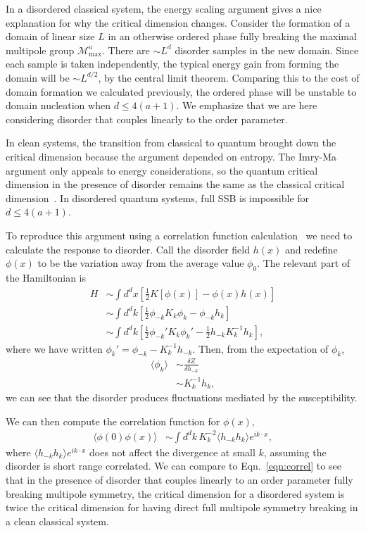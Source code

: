 \documentclass[pra,aps,twocolumn, amsfonts,amsmath,amssymb,nofootinbib,superscriptaddress]{revtex4-2}
\newcommand{\nn}{\nonumber\\}
\renewcommand{\max}{\text{max}}
\newcommand{\half}{\frac{1}{2}}
\begin{document}
In a disordered classical system, the energy scaling argument gives a nice explanation for why the critical dimension changes. Consider the formation of a domain of linear size $L$ in an otherwise ordered phase fully breaking the maximal multipole group $\mathcal{M}^a_\max$. There are $\sim L^d$ disorder samples in the new domain. Since each sample is taken independently, the typical energy gain from forming the domain will be $\sim L^{d/2}$, by the central limit theorem. Comparing this to the cost of domain formation we calculated previously, the ordered phase will be unstable to domain nucleation when $d\le 4(a+1)$. We emphasize that we are here considering disorder that couples linearly to the order parameter. 

In clean systems, the transition from classical to quantum brought down the critical dimension because the argument depended on entropy. The Imry-Ma argument only appeals to energy considerations, so the quantum critical dimension in the presence of disorder remains the same as the classical critical dimension~\cite{Vojta2013}. In disordered quantum systems, full SSB is impossible for $d\le 4(a+1)$.

To reproduce this argument using a correlation function calculation~\cite{ImryMa} we need to calculate the response to disorder. Call the disorder field $h(x)$ and redefine $\phi(x)$ to be the variation away from the average value $\phi_0$. The relevant part of the Hamiltonian is 
\begin{align}
H &\sim \int d^dx \left[ \half K[ \phi(x)] - \phi(x) h(x) \right] \nn
&\sim \int d^dk \left[ \half \phi_{-k} K_k \phi_k - \phi_{-k} h_k \right] \nn
&\sim \int d^dk \left[ \half \phi_{-k}' K_k \phi_k' - \half h_{-k} K^{-1}_k h_k \right],
\end{align}
where we have written $\phi_k' = \phi_{-k} - K^{-1}_k h_{-k}$. Then, from the expectation of $\phi_k$,
\begin{align}
\langle \phi_k \rangle &\sim \frac{\delta Z}{\delta h_{-k} } \nn
&\sim K_k^{-1} h_{k},
\end{align}
we can see that the disorder produces fluctuations mediated by the susceptibility.

We can then compute the correlation function for $\phi(x)$,
\begin{align}
\langle \phi(0) \phi(x) \rangle &\sim \int d^dk \, K_k^{-2} \langle h_{-k} h_{k} \rangle e^{ik\cdot x},
\end{align}
where $\langle h_{-k} h_{k} \rangle e^{ik\cdot x}$ does not affect the divergence at small $k$, assuming the disorder is short range correlated. We can compare to Eqn.~\ref{eqn:correl} to see that in the presence of disorder that couples linearly to an order parameter fully breaking multipole symmetry, the critical dimension for a disordered system is twice the critical dimension for having direct full multipole symmetry breaking in a clean classical system.
\end{document}
